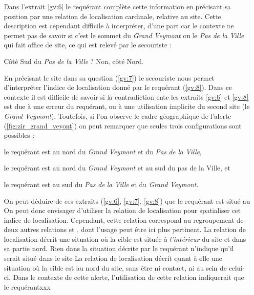 %
Dans l'extrait \ref{gv:6} le requérant complète cette information en
précisant sa position par une relation de localisation cardinale,
relative au site.
%
Cette description est cependant difficile à interpréter, d'une part
car le contexte ne permet pas de savoir si c'est le sommet du
\emph{Grand Veymont} ou le \emph{Pas de la Ville} qui fait office de
site, ce qui est relevé par le secouriste :
%
\begin{dialogue}
  \Sec {} Côté Sud du \emph{Pas de la Ville} ?
%
  \Req {} Non, côté Nord.
\end{dialogue}
%
En précisant le site dans sa question (\ref{gv:7}) le secouriste nous
permet d'interpréter l'indice de localisation donné par le requérant
(\ref{gv:8}).
%
Dans ce contexte il est difficile de savoir si la contradiction ente
les extraits \ref{gv:6} et \ref{gv:8} est due à une erreur du
requérant, ou à une utilisation implicite du second site (le
\emph{Grand Veymont}). Toutefois, si l'on observe le cadre
géographique de l'alerte (\autoref{fig:zir_grand_veyont}) on peut
remarquer que seules trois configurations sont possibles :
%
\begin{enumerate*}[label=(\arabic*)]
\item le requérant est au nord du \emph{Grand Veymont} et du \emph{Pas
    de la Ville},
\item le requérant est au nord du \emph{Grand Veymont} et au sud du
  pas de la Ville, et
\item le requérant est au sud du \emph{Pas de la Ville} et du
  \emph{Grand Veymont.}
\end{enumerate*}
%

On peut déduire de ces extraits (\ref{gv:6}, \ref{gv:7}, \ref{gv:8})
que le requérant est situé au
%
On peut donc envisager d'utiliser la relation de localisation
 pour spatialiser cet indice de
localisation. Cependant, cette relation correspond au regroupement de
deux autres relations  et
, dont l'usage peut être ici plus
pertinent.
%
La relation de localisation 
décrit une situation où la cible est située à \emph{l'intérieur} du
site et dans sa partie nord.
%
Rien dans la situation décrite par le requérant n'indique qu'il serait
situé dans le site
%
La relation de localisation  décrit
quant à elle une situation où la cible est au nord du site, sans être
ni contact, ni au sein de celui-ci.
%
Dans le contexte de cette alerte, l'utilisation de cette relation
indiquerait que le requérantxxx





